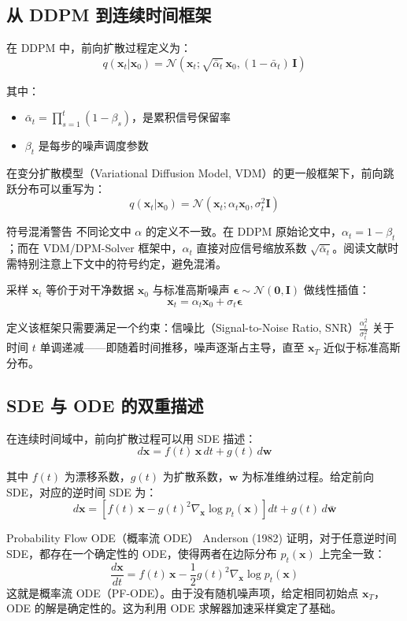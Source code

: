\documentclass[a4paper]{article}
\begin{document}
\subsection{从 DDPM 到连续时间框架}

在 DDPM 中，前向扩散过程定义为：
$$q(\mathbf{x}_t | \mathbf{x}_0) = \mathcal{N}(\mathbf{x}_t; \sqrt{\bar{\alpha}_t}\, \mathbf{x}_0, (1 - \bar{\alpha}_t)\, \mathbf{I})$$

其中：
\begin{itemize}
    \item $\bar{\alpha}_t = \prod_{s=1}^{t} (1 - \beta_s)$，是累积信号保留率
    \item $\beta_t$ 是每步的噪声调度参数
\end{itemize}

在变分扩散模型（Variational Diffusion Model, VDM）的更一般框架下，前向跳跃分布可以重写为：
$$q(\mathbf{x}_t | \mathbf{x}_0) = \mathcal{N}(\mathbf{x}_t; \alpha_t \mathbf{x}_0, \sigma_t^2 \mathbf{I})$$

\begin{warningbox}{符号混淆警告}
不同论文中 $\alpha$ 的定义不一致。在 DDPM 原始论文中，$\alpha_t = 1 - \beta_t$；而在 VDM/DPM-Solver 框架中，$\alpha_t$ 直接对应信号缩放系数 $\sqrt{\bar{\alpha}_t}$。阅读文献时需特别注意上下文中的符号约定，避免混淆。
\end{warningbox}

采样 $\mathbf{x}_t$ 等价于对干净数据 $\mathbf{x}_0$ 与标准高斯噪声 $\boldsymbol{\epsilon} \sim \mathcal{N}(\mathbf{0}, \mathbf{I})$ 做线性插值：
$$\mathbf{x}_t = \alpha_t \mathbf{x}_0 + \sigma_t \boldsymbol{\epsilon}$$

定义该框架只需要满足一个约束：信噪比（Signal-to-Noise Ratio, SNR）$\frac{\alpha_t^2}{\sigma_t^2}$ 关于时间 $t$ 单调递减——即随着时间推移，噪声逐渐占主导，直至 $\mathbf{x}_T$ 近似于标准高斯分布。

\subsection{SDE 与 ODE 的双重描述}

在连续时间域中，前向扩散过程可以用 SDE 描述：
$$d\mathbf{x} = f(t)\, \mathbf{x}\, dt + g(t)\, d\mathbf{w}$$

其中 $f(t)$ 为漂移系数，$g(t)$ 为扩散系数，$\mathbf{w}$ 为标准维纳过程。给定前向 SDE，对应的逆时间 SDE 为：
$$d\mathbf{x} = \left[f(t)\, \mathbf{x} - g(t)^2 \nabla_{\mathbf{x}} \log p_t(\mathbf{x})\right] dt + g(t)\, d\bar{\mathbf{w}}$$

\begin{importantbox}{Probability Flow ODE（概率流 ODE）}
Anderson (1982) 证明，对于任意逆时间 SDE，都存在一个确定性的 ODE，使得两者在边际分布 $p_t(\mathbf{x})$ 上完全一致：
$$\frac{d\mathbf{x}}{dt} = f(t)\, \mathbf{x} - \frac{1}{2} g(t)^2 \nabla_{\mathbf{x}} \log p_t(\mathbf{x})$$
这就是概率流 ODE（PF-ODE）。由于没有随机噪声项，给定相同初始点 $\mathbf{x}_T$，ODE 的解是确定性的。这为利用 ODE 求解器加速采样奠定了基础。
\end{importantbox}
\end{document}

